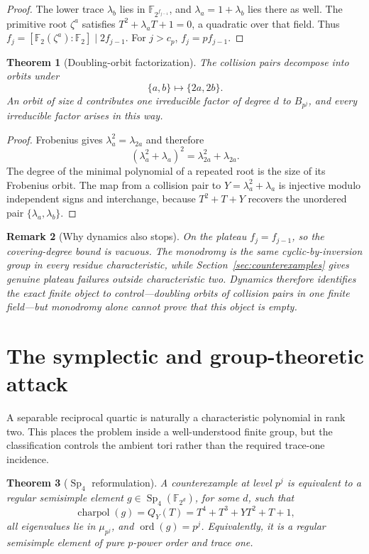 \documentclass[a4paper]{article}
\newtheorem{theorem}{Theorem}[section]
\newtheorem{remark}[theorem]{Remark}
\newcommand{\F}{\mathbb{F}}
\newcommand{\Sp}{\operatorname{Sp}}
\begin{document}
\begin{proof}
	The lower trace $\lambda_b$ lies in
	$\F_{2^{f_{j-1}}}$, and $\lambda_a=1+\lambda_b$ lies there as well.
	The primitive root $\zeta^a$ satisfies
	$T^2+\lambda_aT+1=0$, a quadratic over that field.  Thus
	$f_j=[\F_2(\zeta^a):\F_2]\mid2f_{j-1}$.
	For $j>c_p$, $f_j=pf_{j-1}$.
\end{proof}

\begin{theorem}[Doubling-orbit factorization]\label{thm:dynamics-orbits}
	The collision pairs decompose into orbits under
	\[
		\{a,b\}\longmapsto\{2a,2b\}.
	\]
	An orbit of size $d$ contributes one irreducible factor of degree $d$
	to $B_{p^j}$, and every irreducible factor arises in this way.
\end{theorem}

\begin{proof}
	Frobenius gives $\lambda_a^2=\lambda_{2a}$ and therefore
	\[
		(\lambda_a^2+\lambda_a)^2
		=\lambda_{2a}^2+\lambda_{2a}.
	\]
	The degree of the minimal polynomial of a repeated root is the size of
	its Frobenius orbit.  The map from a collision pair to
	$Y=\lambda_a^2+\lambda_a$ is injective modulo independent signs and
	interchange, because $T^2+T+Y$ recovers the unordered pair
	$\{\lambda_a,\lambda_b\}$.
\end{proof}

\begin{remark}[Why dynamics also stops]
	On the plateau $f_j=f_{j-1}$, so the covering-degree bound is vacuous.
	The monodromy is the same cyclic-by-inversion group in every residue
	characteristic, while Section~\ref{sec:counterexamples} gives genuine
	plateau failures outside characteristic two.  Dynamics therefore
	identifies the exact finite object to control---doubling orbits of
	collision pairs in one finite field---but monodromy alone cannot prove
	that this object is empty.
\end{remark}

\section{The symplectic and group-theoretic attack}\label{sec:sp4}

A separable reciprocal quartic is naturally a characteristic polynomial in
rank two.  This places the problem inside a well-understood finite group,
but the classification controls the ambient tori rather than the required
trace-one incidence.

\begin{theorem}[$\Sp_4$ reformulation]\label{thm:sp4-equivalence}
	A counterexample at level $p^j$ is equivalent to a regular semisimple
	element $g\in\Sp_4(\F_{2^d})$, for some $d$, such that
	\[
		\operatorname{charpol}(g)
		=Q_Y(T)=T^4+T^3+YT^2+T+1,
	\]
	all eigenvalues lie in $\mu_{p^j}$, and
	$\operatorname{ord}(g)=p^j$.  Equivalently, it is a regular
	semisimple element of pure $p$-power order and trace one.
\end{theorem}
\end{document}
